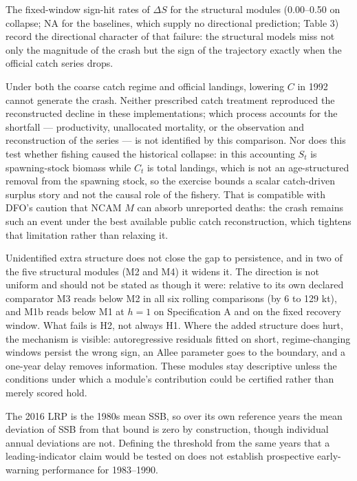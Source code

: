 \documentclass[11pt]{article}
\begin{document}
The fixed-window sign-hit rates of \(\Delta S\) for the structural
modules (0.00--0.50 on collapse; NA for the baselines, which supply no
directional prediction; Table 3) record the directional character of that failure: the
structural models miss not only the magnitude of the crash but the sign
of the trajectory exactly when the official catch series drops.

Under both the coarse catch regime and official landings, lowering \(C\)
in 1992 cannot generate the crash. Neither prescribed catch treatment reproduced the reconstructed decline
in these implementations; which process accounts for the shortfall ---
productivity, unallocated mortality, or the observation and
reconstruction of the series --- is not identified by this comparison.
Nor does this test whether fishing caused the historical collapse: in
this accounting \(S_t\) is spawning-stock biomass while \(C_t\) is total
landings, which is not an age-structured removal from the spawning
stock, so the exercise bounds a scalar catch-driven surplus story and
not the causal role of the fishery. That is
compatible with DFO's caution that NCAM \(M\) can absorb unreported
deaths: the crash remains such an event under the best available public
catch reconstruction, which tightens that limitation rather than
relaxing it.

Unidentified extra structure does not close the gap to persistence, and
in two of the five structural modules (M2 and M4) it widens it. The direction is not uniform
and should not be stated as though it were: relative to its own declared
comparator M3 reads below M2 in all six rolling comparisons (by 6 to 129
kt), and M1b reads below M1 at \(h=1\) on Specification A and on the
fixed recovery window. What fails is H2, not always H1. Where the added
structure does hurt, the mechanism is visible: autoregressive residuals
fitted on short, regime-changing windows persist the wrong sign, an
Allee parameter goes to the boundary, and a one-year delay removes
information. These modules stay descriptive unless the conditions under
which a module's contribution could be certified rather than merely
scored hold.

The 2016 LRP is the 1980s mean SSB, so over its own reference years the
mean deviation of SSB from that bound is zero by construction, though
individual annual deviations are not. Defining the threshold from the
same years that a leading-indicator claim would be tested on does not
establish prospective early-warning performance for 1983--1990.
\end{document}
